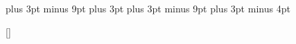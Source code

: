 \titlespacing{\chapter}{0pt}{\parskip}{-\parskip}
\titlespacing{\section}{0pt}{\parskip}{-\parskip}
\titlespacing{\subsection}{0pt}{\parskip}{-\parskip}
\titlespacing{\subsubsection}{0pt}{\parskip}{-\parskip}

\abovedisplayskip=12pt plus 3pt minus 9pt
\abovedisplayshortskip=0pt plus 3pt
\belowdisplayskip=12pt plus 3pt minus 9pt
\belowdisplayshortskip=7pt plus 3pt minus 4pt

\renewcommand{\theenumi}{\arabic{enumi}.} %
\renewcommand{\labelenumi}{\arabic{enumi}.} %
\renewcommand{\theenumii}{\arabic{enumii}.} %
\renewcommand{\labelenumii}{\arabic{enumi}.\arabic{enumii}.}%
\renewcommand{\theenumiii}{\arabic{enumiii}} %
\renewcommand{\labelenumiii}{\arabic{enumi}.\arabic{enumii}.\arabic{enumiii}.}%

\renewcommand{\thechapter}{\arabic{chapter}.}
\renewcommand{\thesection}{\thechapter\arabic{section}.}
\renewcommand{\thesubsection}{\thesection\arabic{subsection}.}
\renewcommand{\thetable}{\arabic{table}}
\renewcommand{\thefigure}{\arabic{figure}}
\renewcommand{\theequation}{\arabic{equation}} %

\addto{}

\newcommand{\changefont}{%
    \fontsize{14pt}{14pt}\selectfont
}

\usepackage{fancyhdr}
\pagestyle{fancy} {%
	\fancyhf{}
	\fancyhead[CE,CO]{\changefont \thepage}
}

\renewcommand{\headrulewidth}{0pt}
\renewcommand{\footrulewidth}{0pt}

\fancypagestyle{plain}{%
	\fancyhf{}
	\fancyhead[CE,CO]{\changefont \thepage}
}

\titleformat{\section}[runin]{}{}{}{}[]

